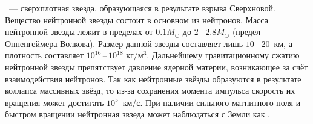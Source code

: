 ~--- сверхплотная звезда, образующаяся в результате взрыва Сверхновой. Вещество нейтронной звезды состоит в основном из нейтронов. Масса нейтронной звезды лежит в пределах от $0.1M_{\odot}$ до $2$\,--\,$2.8M_{\odot}$ (предел Оппенгеймера-Волкова). Размер данной звезды составляет лишь $10$\,--\,$20$~км, а плотность составляет $10^{16}$\,--\,$10^{18}$ $\text{кг}/\text{м}^3$.  Дальнейшему гравитационному сжатию нейтронной звезды препятствует давление ядерной материи, возникающее за счёт взаимодействия нейтронов. Так как нейтронные звёзды образуются в результате  коллапса массивных звёзд, то из-за сохранения момента импульса скорость их вращения может достигать $10^5$~км/с. При наличии сильного магнитного поля и быстром вращении нейтронная звзеда может наблюдаться с Земли как .


